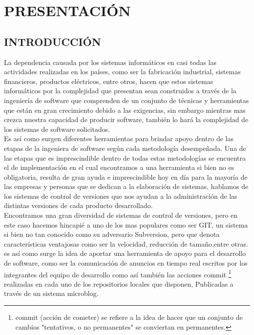 

%
\chapter{PRESENTACIÓN} %
\label{Chapter1}

\section{INTRODUCCIÓN}
La dependencia causada por los sistemas informáticos en casi todas las actividades realizadas en los países, como ser la fabricación industrial, sistemas financieros, productos eléctricos, entre otros,
hacen que estos sistemas informáticos por la complejidad que presentan sean construidos a través de la ingeniería de software que comprenden de un conjunto de técnicas y herramientas que están en gran crecimiento debido a las exigencias, sin embargo mientras mas crezca nuestra capacidad de producir software, también lo hará la complejidad de los sistemas de software solicitados.\\

Es así como surgen diferentes herramientas para brindar apoyo dentro de las etapas de la ingeniera de software según cada metodología desempeñada. Una de las etapas que es imprescindible dentro de todas estas metodologías se encuentra el de implementación en el cual encontramos a una herramienta si bien no es obligatoria, resulta de gran ayuda e imprescindible hoy en día para la mayoría de las empresas y personas que se dedican a la elaboración de sistemas, hablamos de los sistemas de control de versiones que nos ayudan a la administración de las distintas versiones de cada producto desarrollado.\\

Encontramos una gran diversidad de sistemas de control de versiones, pero en este caso hacemos hincapié a uno de los mas populares como ser GIT, un sistema si bien no tan conocido como su adversario Subversion, pero que denota características ventajosas como ser la velocidad, reducción de tamaño,entre otras. es así como surge la idea de aportar una herramienta de apoyo para el desarrollo de software, como ser la comunicación de anuncios en tiempo real escritos por los integrantes del equipo de desarrollo como así también las acciones commit \footnote{commit (acción de cometer) se refiere a la idea de hacer que un conjunto de cambios "tentativos, o no permanentes" se conviertan en permanentes.} realizadas en cada uno de los repositorios locales que disponen, Publicadas a través de un sistema microblog.\\

